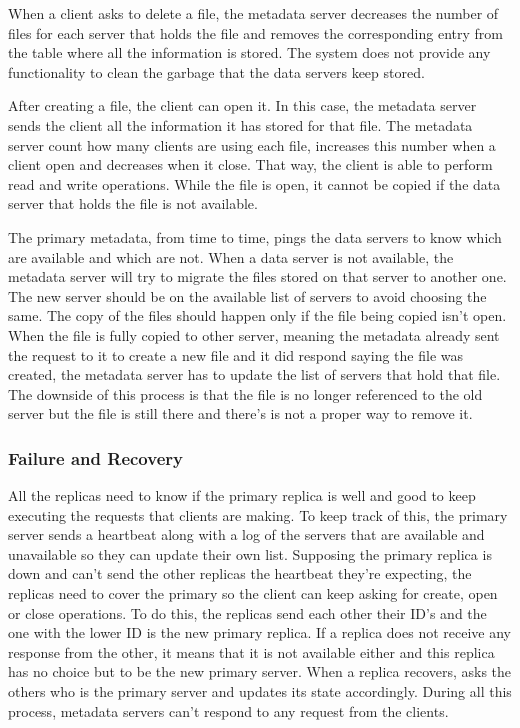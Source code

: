 When a client asks to delete a file, the metadata server decreases the
number of files for each server that holds the file and removes the 
corresponding entry from the table where all the information is stored. 
The system does not provide any functionality to clean the garbage that 
the data servers keep stored.

After creating a file, the client can open it. In this case, the metadata 
server sends the client all the information it has stored for that file.
The metadata server count how many clients are using each file, increases
this number when a client open and decreases when it close.
That way, the client is able to perform read and write operations. While 
the file is open, it cannot be copied if the data server that holds the 
file is not available.

The primary metadata, from time to time, pings the data servers to know 
which are available and which are not. When a data server is not 
available, the metadata server will try to migrate the files stored on 
that server to another one. The new server should be on the available list of
servers to avoid choosing the same. The copy of the files should happen only
if the file being copied isn't open. When the file is fully copied to other 
server, meaning the metadata already sent the request to it to create a 
new file and it did respond saying the file was created, the metadata 
server has to update the list of servers that hold that file. The downside 
of this process is that the file is no longer referenced to the 
old server but the file is still there and there's is not a proper way 
to remove it.

\subsubsection{Failure and Recovery}

All the replicas need to know if the primary replica is well and good to 
keep executing the requests that clients are making. To keep track of this, 
the primary server sends a heartbeat along with a log of the servers that 
are available and unavailable so they can update their own list. Supposing 
the primary replica is down and can't send the other replicas the heartbeat 
they're expecting, the replicas need to cover the primary so the client can 
keep asking for create, open or close operations. To do this, the replicas 
send each other their ID's and the one with the lower ID is the new primary
replica. If a replica does not receive any response from the other, it 
means that it is not available either and this replica has no choice but to 
be the new primary server. When a replica recovers, asks the others who is 
the primary server and updates its state accordingly. During all this process, 
metadata servers can't respond to any request from the clients.